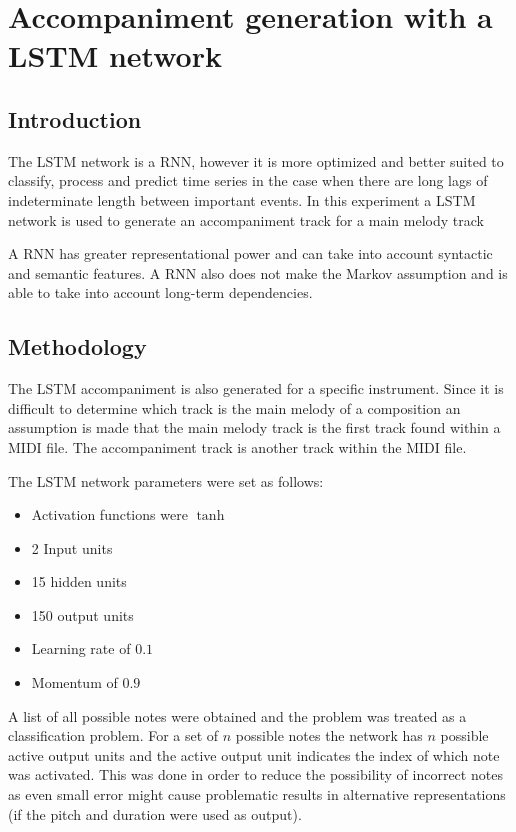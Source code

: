 \chapter{Accompaniment generation with a LSTM network} \label{ch:accomp_lstm}
\section{Introduction}
The \ac{LSTM} network is a \acf{RNN}, however it is more optimized and better suited to classify, process and predict time series in the case when there are long lags of indeterminate length between important events. In this experiment a \ac{LSTM} network is used to generate an accompaniment track for a main melody track

A \ac{RNN} has greater representational power and can take into account syntactic and semantic features. A \ac{RNN} also does not make the Markov assumption and is able to take into account long-term dependencies.

\section{Methodology}
The \ac{LSTM} accompaniment is also generated for a specific instrument. 
Since it is difficult to determine which track is the main melody of a composition an assumption is made that the main melody track is the first track found within a \ac{MIDI} file. The accompaniment track is another track within the \ac{MIDI} file.

The LSTM network parameters were set as follows:
\begin{itemize}
\item Activation functions were $\tanh$
\item 2 Input units
\item 15 hidden units
\item 150 output units
\item Learning rate of $0.1$
\item Momentum of $0.9$
\end{itemize}

A list of all possible notes were obtained and the problem was treated as a classification problem. For a set of $n$ possible notes the network has $n$ possible active output units and the active output unit indicates the index of which note was activated. This was done in order to reduce the possibility of incorrect notes as even small error might cause problematic results in alternative representations (if the pitch and duration were used as output).

